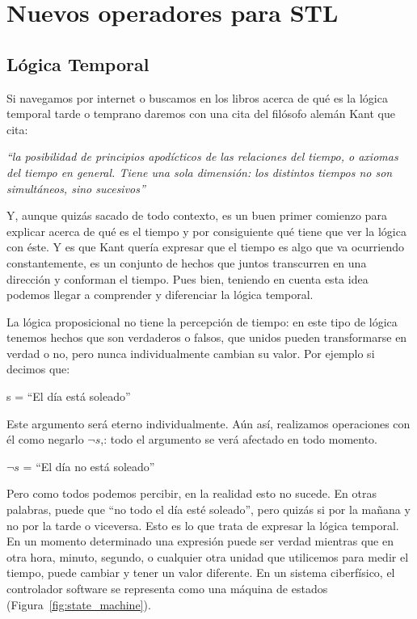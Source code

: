 \chapter{Nuevos operadores para STL}
\label{cha:stl}

\section{Lógica Temporal}

Si navegamos por internet o buscamos en los libros acerca de qué es la lógica temporal tarde o temprano daremos con una cita del filósofo alemán Kant que cita: 

\begin{center}
\textit{``la posibilidad de principios apodícticos de las relaciones del tiempo, o axiomas del tiempo en general. Tiene una sola dimensión: los distintos tiempos no son simultáneos, sino sucesivos''}
\end{center}

Y, aunque quizás sacado de todo contexto, es un buen primer comienzo para explicar acerca de qué es el tiempo y por consiguiente qué tiene que ver la lógica con éste. Y es que Kant quería expresar que el tiempo es algo que va ocurriendo constantemente, es un conjunto de hechos que juntos transcurren en una dirección y conforman el tiempo. Pues bien, teniendo en cuenta esta idea podemos llegar a comprender y diferenciar la lógica temporal. 

La lógica proposicional no tiene la percepción de tiempo: en este tipo de lógica tenemos hechos que son verdaderos o falsos, que unidos pueden transformarse en verdad o no, pero nunca individualmente cambian su valor. Por ejemplo si decimos que:

\begin{center}
s = ``El día está soleado''
\end{center}

Este argumento será eterno individualmente. Aún así, realizamos operaciones con él como negarlo $\neg{s}$,: todo el argumento se verá afectado en todo momento.

\begin{center}
$\neg{s}$ = ``El día no está soleado''
\end{center}

Pero como todos podemos percibir, en la realidad esto no sucede. En otras palabras, puede que ``no todo el día esté soleado'', pero quizás si por la mañana y no por la tarde o viceversa. Esto es lo que trata de expresar la lógica temporal. En un momento determinado una expresión puede ser verdad mientras que en otra hora, minuto, segundo, o cualquier otra unidad que utilicemos para medir el tiempo, puede cambiar y tener un valor diferente. En un sistema ciberfísico, el controlador software se representa como una máquina de estados (Figura~\ref{fig:state_machine}).

